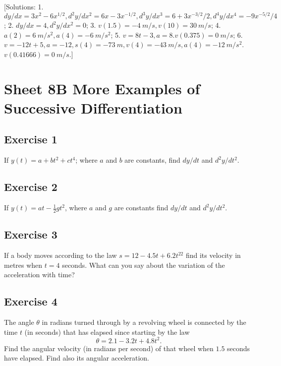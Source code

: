 \documentclass[
  11pt,
  oneside]{book}
\newcommand{\slide}{}
\theoremstyle{definition}
\theoremstyle{definition}
\theoremstyle{definition}
\theoremstyle{definition}
\theoremstyle{remark}
\begin{document}
{[}Solutions: 1. \(dy/dx=3x^2-6x^{1/2}, d^2y/dx^2=6x-3x^{-1/2}, d^3y/dx^3=6+3x^{-3/2}/2, d^4y/dx^4=-9x^{-5/2}/4\); 2. \(dy/dx=4, d^2y/dx^2=0\); 3. \(v(1.5) = -4\ m/s, v(10) = 30\ m/s\); 4. \(a(2) = 6\ m/s^2, a(4) = -6\ m/s^2\); 5. \(v=8t-3, a=8. v(0.375)=0\ m/s\); 6. \(v = -12t+5, a=-12, s(4) = -73\ m, v(4)=-43\ m/s, a(4)=-12\ m/s^2\). \(v(0.41666)=0\ m/s\).{]}
\slide

\section{Sheet 8B More Examples of Successive Differentiation}\label{sheet-8b-more-examples-of-successive-differentiation}

\subsection*{Exercise 1}\label{exercise-1-3}

If \(y(t) = a + bt^2 + ct^4\); where \(a\) and \(b\) are constants, find \(dy/dt\) and \(d^2y/dt^2\).

\slide

\subsection*{Exercise 2}\label{exercise-2-3}

If \(y(t) = at -\frac 12gt^2\), where \(a\) and \(g\) are constants find \(dy/dt\) and \(d^2y/dt^2\).

\slide

\subsection*{Exercise 3}\label{exercise-3-2}

If a body moves according to the law \(s = 12 - 4.5t + 6.2t^22\) find its velocity in metres when \(t = 4\) seconds. What can you say about the variation of the acceleration with time?

\slide

\subsection*{Exercise 4}\label{exercise-4-2}

The angle \(\theta\) in radians turned through by a revolving wheel is connected by the time \(t\) (in seconds) that has elapsed since starting by the law
\[
\theta = 2.1 - 3.2t + 4.8t^2.
\]
Find the angular velocity (in radians per second) of that wheel when \(1.5\) seconds have elapsed. Find also its angular acceleration.
\end{document}
